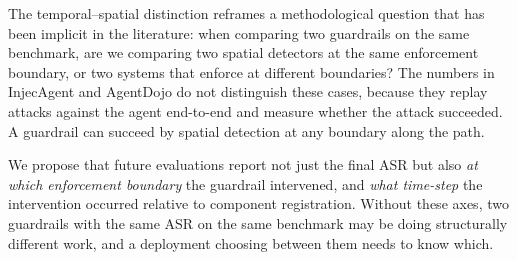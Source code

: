 The temporal--spatial distinction reframes a methodological question that
has been implicit in the literature: when comparing two guardrails on
the same benchmark, are we comparing two spatial detectors at the same
enforcement boundary, or two systems that enforce at different boundaries?
The numbers in InjecAgent and AgentDojo do not distinguish these cases,
because they replay attacks against the agent end-to-end and measure
whether the attack succeeded. A guardrail can succeed by spatial detection
at any boundary along the path.

We propose that future evaluations report not just the final ASR but also
\emph{at which enforcement boundary} the guardrail intervened, and
\emph{what time-step} the intervention occurred relative to component
registration. Without these axes, two guardrails with the same ASR on the
same benchmark may be doing structurally different work, and a deployment
choosing between them needs to know which.

